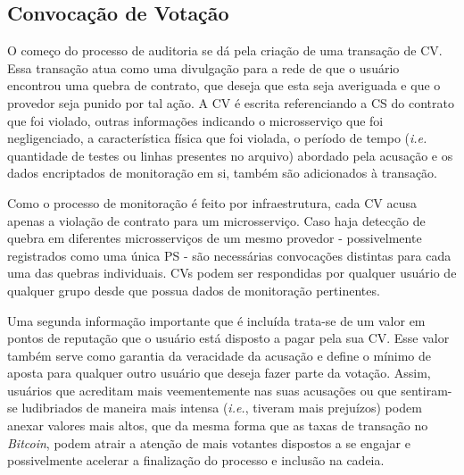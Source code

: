 %
\subsection{Convocação de Votação}
\label{sec:proposta:auditoria:cv}

O começo do processo de auditoria se dá pela criação de uma transação de \ac{CV}. Essa transação atua como uma divulgação para a rede de que o usuário encontrou uma quebra de contrato, que deseja que esta seja averiguada e que o provedor seja punido por tal ação. A \ac{CV} é escrita referenciando a \ac{CS} do contrato que foi violado, outras informações indicando o microsserviço que foi negligenciado, a característica física que foi violada, o período de tempo (\textit{i.e.} quantidade de testes ou linhas presentes no arquivo) abordado pela acusação e os dados encriptados de monitoração em si, também são adicionados à transação. 

%
Como o processo de monitoração é feito por infraestrutura, cada \ac{CV} acusa apenas a violação de contrato para um microsserviço. Caso haja detecção de quebra em diferentes microsserviços de um mesmo provedor - possivelmente registrados como uma única \ac{PS} - são necessárias convocações distintas para cada uma das quebras individuais. \acp{CV} podem ser respondidas por qualquer usuário de qualquer grupo desde que possua dados de monitoração pertinentes.

%
Uma segunda informação importante que é incluída trata-se de um valor em pontos de reputação que o usuário está disposto a pagar pela sua \ac{CV}. Esse valor também serve como garantia da veracidade da acusação e define o mínimo de aposta para qualquer outro usuário que deseja fazer parte da votação. Assim, usuários que acreditam mais veementemente nas suas acusações ou que sentiram-se ludibriados de maneira mais intensa (\textit{i.e.}, tiveram mais prejuízos) podem anexar valores mais altos, que da mesma forma que as taxas de transação no \textit{Bitcoin}, podem atrair a atenção de mais votantes dispostos a se engajar e possivelmente acelerar a finalização do processo e inclusão na cadeia.


